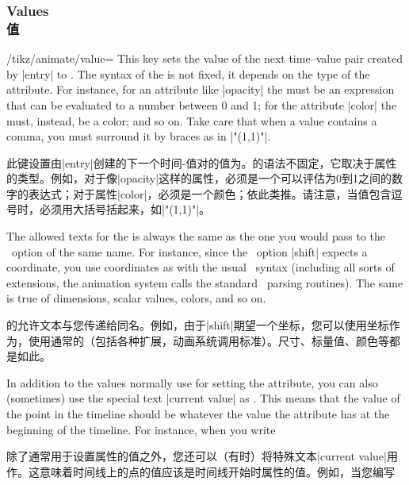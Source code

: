 \subsubsection{Values\\值}
\label{section-anim-def-values}

\begin{key}{/tikz/animate/value=}
    This key sets the value of the next time--value pair created by |entry| to
    . The syntax of the  is not fixed, it depends on
    the type of the attribute. For instance, for an attribute like |opacity|
    the  must be an expression that can be evaluated to a number
    between 0 and 1; for the attribute |color| the  must, instead,
    be a color; and so on. Take care that when a value contains a comma, you
    must surround it by braces as in |"{(1,1)}"|.

    此键设置由|entry|创建的下一个时间-值对的值为。的语法不固定，它取决于属性的类型。例如，对于像|opacity|这样的属性，必须是一个可以评估为0到1之间的数字的表达式；对于属性|color|，必须是一个颜色；依此类推。请注意，当值包含逗号时，必须用大括号括起来，如|"{(1,1)}"|。

    The allowed texts for the  is always the same as the one you
    would pass to the \tikzname\ option of the same name. For instance, since
    the \tikzname\ option |shift| expects a coordinate, you use coordinates as
     with the usual \tikzname\ syntax (including all sorts of
    extensions, the animation system calls the standard \tikzname\ parsing
    routines). The same is true of dimensions, scalar values, colors, and so
    on.

    的允许文本与您传递给同名\tikzname{}。例如，由于\tikzname{}|shift|期望一个坐标，您可以使用坐标作为，使用通常的\tikzname{}（包括各种扩展，动画系统调用标准\tikzname{}）。尺寸、标量值、颜色等都是如此。

    In addition to the values normally use for setting the attribute, you can
    also (sometimes) use the special text |current value| as . This
    means that the value of the point in the timeline should be whatever the
    value the attribute has at the beginning of the timeline. For instance,
    when you write
    
    除了通常用于设置属性的值之外，您还可以（有时）将特殊文本|current value|用作。这意味着时间线上的点的值应该是时间线开始时属性的值。例如，当您编写



\end{key}
